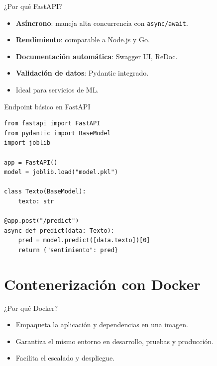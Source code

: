 \documentclass[aspectratio=169, 10pt, xcolor=table]{beamer}
\begin{document}
\begin{frame}{¿Por qué FastAPI?}
    \begin{itemize}
        \item \textbf{Asíncrono}: maneja alta concurrencia con \texttt{async/await}.
        \item \textbf{Rendimiento}: comparable a Node.js y Go.
        \item \textbf{Documentación automática}: Swagger UI, ReDoc.
        \item \textbf{Validación de datos}: Pydantic integrado.
        \item Ideal para servicios de ML.
    \end{itemize}
\end{frame}

\begin{frame}[fragile]{Endpoint básico en FastAPI}
    \begin{lstlisting}
from fastapi import FastAPI
from pydantic import BaseModel
import joblib

app = FastAPI()
model = joblib.load("model.pkl")

class Texto(BaseModel):
    texto: str

@app.post("/predict")
async def predict(data: Texto):
    pred = model.predict([data.texto])[0]
    return {"sentimiento": pred}
    \end{lstlisting}
\end{frame}

\section{Contenerización con Docker}

\begin{frame}{¿Por qué Docker?}
    \begin{itemize}
        \item Empaqueta la aplicación y dependencias en una imagen.
        \item Garantiza el mismo entorno en desarrollo, pruebas y producción.
        \item Facilita el escalado y despliegue.
    \end{itemize}
\end{frame}
\end{document}
